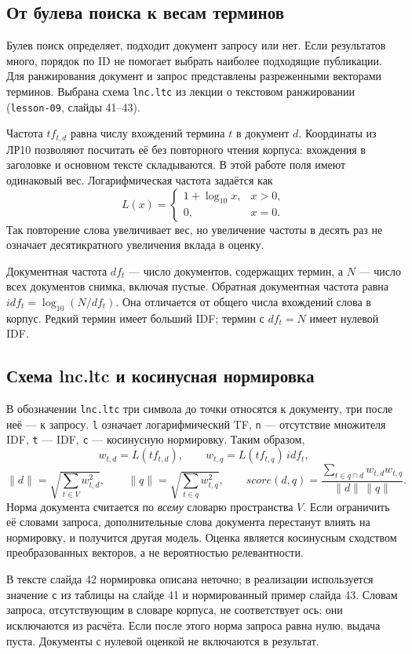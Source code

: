 \documentclass[12pt,a4paper]{article}
\begin{document}
\subsection{От булева поиска к весам терминов}
Булев поиск определяет, подходит документ запросу или нет. Если результатов
много, порядок по ID не помогает выбрать наиболее подходящие публикации.
Для ранжирования документ и запрос представлены разреженными векторами
терминов. Выбрана схема \texttt{lnc.ltc} из лекции о текстовом ранжировании
(\texttt{lesson-09}, слайды 41--43).

Частота $tf_{t,d}$ равна числу вхождений термина $t$ в документ $d$.
Координаты из ЛР10 позволяют посчитать её без повторного чтения корпуса:
вхождения в заголовке и основном тексте складываются. В этой работе поля
имеют одинаковый вес. Логарифмическая частота задаётся как
\[
 L(x)=\begin{cases}1+\log_{10}x,&x>0,\\0,&x=0.\end{cases}
\]
Так повторение слова увеличивает вес, но увеличение частоты в десять раз
не означает десятикратного увеличения вклада в оценку.

Документная частота $df_t$ --- число документов, содержащих термин,
а $N$ --- число всех документов снимка, включая пустые. Обратная
документная частота равна $idf_t=\log_{10}(N/df_t)$.
Она отличается от общего числа вхождений слова в корпус.
Редкий термин имеет больший IDF; термин с $df_t=N$ имеет нулевой IDF.

\subsection{Схема lnc.ltc и косинусная нормировка}
В обозначении \texttt{lnc.ltc} три символа до точки относятся к документу,
три после неё --- к запросу. \texttt{l} означает логарифмический TF,
\texttt{n} --- отсутствие множителя IDF, \texttt{t} --- IDF,
\texttt{c} --- косинусную нормировку. Таким образом,
\[
 w_{t,d}=L(tf_{t,d}),\qquad w_{t,q}=L(tf_{t,q})\,idf_t,
\]
\[
 \|d\|=\sqrt{\sum_{t\in V}w_{t,d}^2},\qquad
 \|q\|=\sqrt{\sum_{t\in q}w_{t,q}^2},\qquad
 score(d,q)=\frac{\sum_{t\in q\cap d}w_{t,d}w_{t,q}}{\|d\|\,\|q\|}.
\]
Норма документа считается по \emph{всему} словарю пространства $V$.
Если ограничить её словами запроса, дополнительные слова документа
перестанут влиять на нормировку, и получится другая модель.
Оценка является косинусным сходством преобразованных векторов,
а не вероятностью релевантности.

В тексте слайда 42 нормировка описана неточно; в реализации используется
значение \texttt{c} из таблицы на слайде 41 и нормированный пример слайда 43.
Словам запроса, отсутствующим в словаре корпуса, не соответствует ось:
они исключаются из расчёта. Если после этого норма запроса равна нулю,
выдача пуста. Документы с нулевой оценкой не включаются в результат.
\end{document}
